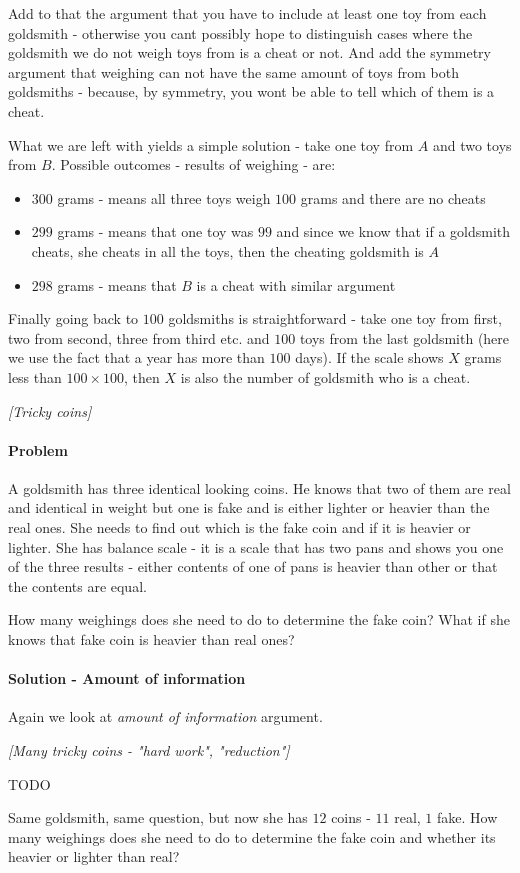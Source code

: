 \begin{problem}
Add to that the argument that you have to include at least one toy from each goldsmith - otherwise you cant possibly hope to distinguish cases where the goldsmith we do not weigh toys from is a cheat or not. And add the symmetry argument that weighing can not have the same amount of toys from both goldsmiths - because, by symmetry, you wont be able to tell which of them is a cheat. 

What we are left with yields a simple solution - take one toy from $A$ and two toys from $B$. Possible outcomes - results of weighing - are:
\begin{itemize}
\item $300$ grams - means all three toys weigh $100$ grams and there are no cheats
\item $299$ grams - means that one toy was $99$ and since we know that if a goldsmith cheats, she cheats in all the toys, then the cheating goldsmith is $A$
\item $298$ grams - means that $B$ is a cheat with similar argument
\end{itemize}

Finally going back to $100$ goldsmiths is straightforward - take one toy from first, two from second, three from third etc. and $100$ toys from the last goldsmith (here we use the fact that a year has more than $100$ days). If the scale shows $X$ grams less than $100\times100$, then $X$ is also the number of goldsmith who is a cheat.

\end{problem}
%

\begin{problem}
\textit{[Tricky coins]}

\paragraph{Problem}

A goldsmith has three identical looking coins. He knows that two of them are real and identical in weight but one is fake and is either lighter or heavier than the real ones. She needs to find out which is the fake coin and if it is heavier or lighter.
She has balance scale - it is a scale that has two pans and shows you one of the three results - either contents of one of pans is heavier than other or that the contents are equal.

How many weighings does she need to do to determine the fake coin? What if she knows that fake coin is heavier than real ones?


\paragraph{Solution - Amount of information}

Again we look at \textit{amount of information} argument. 

\end{problem}
%

\begin{problem}
\textit{[Many tricky coins - "hard work", "reduction"]}

TODO 

Same goldsmith, same question, but now she has $12$ coins - $11$ real, $1$ fake.
How many weighings does she need to do to determine the fake coin and whether its heavier or lighter than real? 
\end{problem}
%


